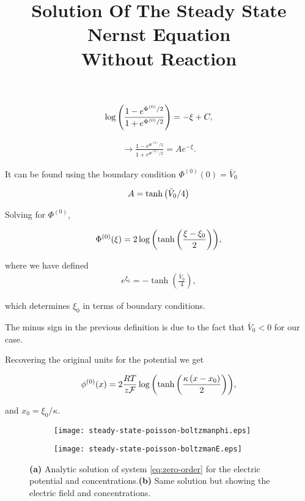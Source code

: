 \begin{align}
	\log\left({\frac{1-e^{\Phi^{(0)}/2}}{1+e^{\Phi^{(0)}/2}}}\right) = -\xi + C,
\end{align}

\begin{align}
	\rightarrow \frac{1-e^{\Phi^{(0)}/2}}{1+e^{\Phi^{(0)}/2}}= Ae^{-\xi}.
\end{align}

It can be found using the boundary condition $\Phi^{(0)}(0) = \bar{V}_0$

\begin{align}
A = \tanh\left({{\bar{V}_0/4}}\right)
\end{align}

Solving for $\Phi^{(0)}$,

\begin{align}
\Phi^{(0)}(\xi) =  2\log{ \left({\tanh \left({\frac{\xi-\xi_0}{2}}\right) }\right) },
\label{eq:pot0}
\end{align}

where we have defined
\begin{align}
\label{eq:expz0}
e^{\xi_0}=-\tanh{\left(\frac{\bar{V}_0}{4}\right)},	
\end{align}

which determines $\xi_0$ in terms of boundary conditions.

The minus sign in the previous definition is due to the fact that $\bar{V}_0 < 0$ for our case.

Recovering the original units for the potential we get

\begin{align}
\label{eq:pot_units}
\phi^{(0)}(x) =  2\frac{RT}{z\mathcal{F}}\log{ \left({\tanh \left({\frac{\kappa\left(x-x_0\right)}{2}}\right) }\right) },
\end{align}

and  $x_0 = \xi_0/\kappa$.

\begin{figure}[htbp!]
\centering
\title{\bf{Solution Of The Steady State Nernst Equation\\ Without Reaction}}
\label{fig:zero-order}
\begin{subfigure}{.4\textwidth}
  \centering
  \texttt{[image: steady-state-poisson-boltzmanphi.eps]}
  \caption{}
\end{subfigure}%
\begin{subfigure}{.4\textwidth}
  \centering
  \texttt{[image: steady-state-poisson-boltzmanE.eps]}
  \caption{}
\end{subfigure}
\caption{\textbf{(a)} Analytic solution of system \ref{eq:zero-order} for the electric potential and concentrations.\textbf{(b)} Same solution but showing the electric field and concentrations.}
\end{figure}



